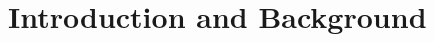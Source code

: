 \documentclass[11pt]{SANDreport}
\begin{document}
%
\clearpage
\tableofcontents




%
\SANDmain %


%
\section{Introduction and Background}
%
\end{document}
